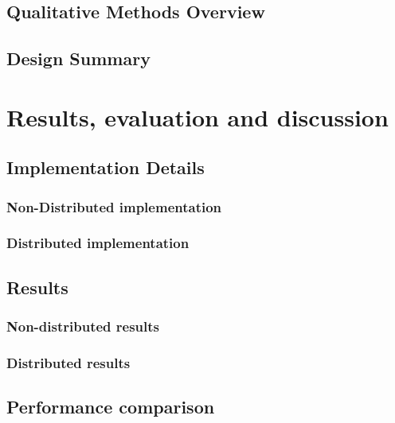 \documentclass[oneside,12pt]{book}
\begin{document}
\subsubsection{}

\section{Qualitative Methods Overview}
\section{Design Summary}


\chapter{Results, evaluation and discussion}
\section{Implementation Details}

\subsection{Non-Distributed implementation}

\subsection{Distributed implementation}

\section{Results}

\subsection{Non-distributed results}

\subsection{Distributed results}

\section{Performance comparison}
\end{document}
